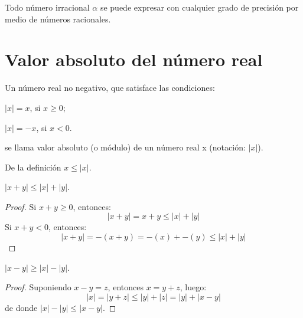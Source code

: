 \begin{theorem}
  Todo número irracional $\alpha$ se puede expresar con cualquier grado de precisión por medio de números racionales.
\end{theorem}




\section{Valor absoluto del número real}


\begin{definition}
  Un número real no negativo, que satisface las condiciones:
  \begin{description}
  \item $|x| = x$, si $x \ge 0$;
  \item $|x| = -x$, si $x < 0$.
  \end{description}
  se llama valor absoluto (o módulo) de un número real x (notación: $|x|$).
\end{definition}

De la definición $x \le |x|$.

\begin{proposition}
  $|x + y| \le |x| + |y|$.
\end{proposition}

\begin{proof}
  Si $x + y \ge 0$, entonces: $$|x + y| = x + y \le |x| + |y|$$
  Si $x + y < 0$, entonces: $$|x + y| = -(x + y) = -(x) + -(y) \le |x| + |y|$$
\end{proof}

\begin{proposition}
  $|x - y| \ge |x| - |y|$.
\end{proposition}

\begin{proof}
  Suponiendo $x - y = z$, entonces $x = y + z$, luego:
  $$|x| = |y + z| \le |y| + |z| = |y| + |x - y|$$
  de donde $|x| - |y| \le |x - y|$.
\end{proof}






